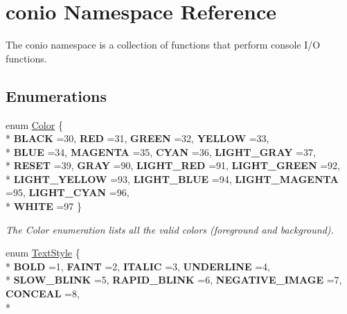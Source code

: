 \hypertarget{namespaceconio}{}\section{conio Namespace Reference}
\label{namespaceconio}


The conio namespace is a collection of functions that perform console I/O functions.  


\subsection*{Enumerations}
\begin{DoxyCompactItemize}
\item 
enum \hyperlink{namespaceconio_a5580b879f58716cb8abe8eb7ecb789eb}{Color} \{ \\*
{\bfseries B\+L\+A\+CK} =30, 
{\bfseries R\+ED} =31, 
{\bfseries G\+R\+E\+EN} =32, 
{\bfseries Y\+E\+L\+L\+OW} =33, 
\\*
{\bfseries B\+L\+UE} =34, 
{\bfseries M\+A\+G\+E\+N\+TA} =35, 
{\bfseries C\+Y\+AN} =36, 
{\bfseries L\+I\+G\+H\+T\+\_\+\+G\+R\+AY} =37, 
\\*
{\bfseries R\+E\+S\+ET} =39, 
{\bfseries G\+R\+AY} =90, 
{\bfseries L\+I\+G\+H\+T\+\_\+\+R\+ED} =91, 
{\bfseries L\+I\+G\+H\+T\+\_\+\+G\+R\+E\+EN} =92, 
\\*
{\bfseries L\+I\+G\+H\+T\+\_\+\+Y\+E\+L\+L\+OW} =93, 
{\bfseries L\+I\+G\+H\+T\+\_\+\+B\+L\+UE} =94, 
{\bfseries L\+I\+G\+H\+T\+\_\+\+M\+A\+G\+E\+N\+TA} =95, 
{\bfseries L\+I\+G\+H\+T\+\_\+\+C\+Y\+AN} =96, 
\\*
{\bfseries W\+H\+I\+TE} =97
 \}\hypertarget{namespaceconio_a5580b879f58716cb8abe8eb7ecb789eb}{}\label{namespaceconio_a5580b879f58716cb8abe8eb7ecb789eb}
\begin{DoxyCompactList}\small\item\em The Color enumeration lists all the valid colors (foreground and background). \end{DoxyCompactList}
\item 
enum \hyperlink{namespaceconio_a4c720b3477d66baeb5a8c8c60b9d2002}{Text\+Style} \{ \\*
{\bfseries B\+O\+LD} =1, 
{\bfseries F\+A\+I\+NT} =2, 
{\bfseries I\+T\+A\+L\+IC} =3, 
{\bfseries U\+N\+D\+E\+R\+L\+I\+NE} =4, 
\\*
{\bfseries S\+L\+O\+W\+\_\+\+B\+L\+I\+NK} =5, 
{\bfseries R\+A\+P\+I\+D\+\_\+\+B\+L\+I\+NK} =6, 
{\bfseries N\+E\+G\+A\+T\+I\+V\+E\+\_\+\+I\+M\+A\+GE} =7, 
{\bfseries C\+O\+N\+C\+E\+AL} =8, 
\\*

\end{DoxyCompactItemize}
